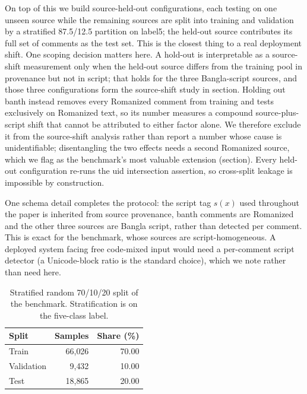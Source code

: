 \documentclass[11pt,a4paper]{article}
\def\dset#1{#1}%
\def\cref#1{section}%
\def\texttt#1{#1}%
\def\textsc#1{#1}%
\def\emph#1{#1}%
\providecommand{\dset}[1]{\textsc{#1}}
\begin{document}
On top of this we build \emph{source-held-out} configurations, each testing on one unseen source while the remaining sources are split into training and validation by a stratified 87.5/12.5 partition on \texttt{label5}; the held-out source contributes its full set of comments as the test set. This is the closest thing to a real deployment shift. One scoping decision matters here. A hold-out is interpretable as a \emph{source-shift} measurement only when the held-out source differs from the training pool in provenance but not in script; that holds for the three Bangla-script sources, and those three configurations form the source-shift study in \cref{sec:robustness-results}. Holding out \dset{banth} instead removes every Romanized comment from training and tests exclusively on Romanized text, so its number measures a compound source-plus-script shift that cannot be attributed to either factor alone. We therefore exclude it from the source-shift analysis rather than report a number whose cause is unidentifiable; disentangling the two effects needs a second Romanized source, which we flag as the benchmark's most valuable extension (\cref{sec:limitations}). Every held-out configuration re-runs the \texttt{uid} intersection assertion, so cross-split leakage is impossible by construction.

One schema detail completes the protocol: the script tag $s(x)$ used throughout the paper is inherited from source provenance, \dset{banth} comments are Romanized and the other three sources are Bangla script, rather than detected per comment. This is exact for the benchmark, whose sources are script-homogeneous. A deployed system facing free code-mixed input would need a per-comment script detector (a Unicode-block ratio is the standard choice), which we note rather than need here.

\begin{table}[!htbp]
\centering
\caption{Stratified random 70/10/20 split of the benchmark. Stratification is on the five-class label.}
\label{tab:split}
\small
\begin{tabular}{@{}lrr@{}}
\toprule
\textbf{Split} & \textbf{Samples} & \textbf{Share (\%)} \\
\midrule
Train & 66{,}026 & 70.00 \\
Validation & 9{,}432 & 10.00 \\
Test & 18{,}865 & 20.00 \\
\bottomrule
\end{tabular}
\end{table}
\end{document}
